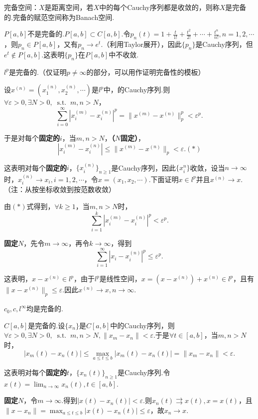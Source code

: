 \documentclass[bwprint, withoutpreface]{cumcmthesis}
\newcommand*{\st}{\mathop{}\!\mathrm{s.t.}\!\mathop{}}
\newcommand*{\norm}[1]{\| #1 \|}
\newcommand*{\nnorm}[2]{\| #1 \|_{#2}}
\begin{document}
完备空间：$X$是距离空间，若$X$中的每个Cauchy序列都是收敛的，则称$X$是完备的.完备的赋范空间称为Banach空间.

$P[a, b]$不是完备的.$P[a, b] \subset C[a, b]$.令$p_n(t) = 1 + \frac{t}{1!} + \frac{t^2}{2!} + \cdots + \frac{t^n}{n!}, n = 1, 2, \cdots$，则$p_n \in P[a, b]$，又有$p_n \to e^t$.（利用Taylor展开），因此$\{p_n\}$是Cauchy序列，但$e^t \not\in P[a, b]$.这表明$\{p_n\}$在$P[a, b]$中不收敛.

$l^p$是完备的.（仅证明$p \neq \infty$的部分，可以用作证明完备性的模板）

设$x^{(n)} = (x_1^{(n)}, x_2^{(n)}, \cdots)$是$l^p$中，的Cauchy序列.则$\forall \varepsilon > 0, \exists N > 0, \st m, n > N$，\[\sum_{i = 0}^{\infty}{|x_i^{(m)} - x_i^{(n)}|^p} = \nnorm{x^{(m)} - x^{(n)}}{p}^p < \varepsilon^p.\]

于是对每个\textbf{固定的}$i$，当$m, n > N$，\textbf{（$N$固定）}，\[|x_i^{(m)} - x_i^{(n)}| \leqslant \nnorm{x^{(m)} - x^{(n)}}{p} < \varepsilon. (*)\]

这表明对每个\textbf{固定的}$i$，$\{x_i^{(n)}\}_{n \geqslant 1}$是Cauchy序列，因此$\{x_i^{n}\}$收敛，设当$n \to \infty$时，$x_i^{(n)} \to x_i, i = 1, 2, \cdots$，令$x = (x_1, x_2, \cdots)$.下面证明$x \in l^p$并且$x^{(n)} \to x$.（注：从按坐标收敛到按范数收敛）

由$(*)$式得到，$\forall k \geqslant 1$，当$m, n > N$时，\[\sum_{i = 1}^{k}|x_i^{(m)} - x_i^{(n)}|^p < \varepsilon^p.\]

\textbf{固定$N$}，先令$m \to \infty$，再令$k \to \infty$，得到\[\sum_{i = 1}^{\infty}{|x_i - x_i^{(n)}|^p} \leqslant \varepsilon^p.\]

这表明，$x - x^{(n)} \in l^p$，由于$l^p$是线性空间，$x = (x - x^{(n)}) + x^{(n)} \in l^p$，且有$\nnorm{x - x^{(n)}}{p} \leqslant \varepsilon.$因此$x^{(n)} \to x, n \to \infty.$

$c_0, c, l^{\infty}$均是完备的.

$C[a, b]$是完备的.设$\{x_n\}$是$C[a, b]$中的Cauchy序列，则$\forall \varepsilon > 0, \exists N > 0, \st m, n > N, \norm{x_m - x_n} < \varepsilon$.于是$\forall t \in [a, b]$，当$m, n > N$时，\[|x_m(t) - x_n(t)| \leqslant \max_{a \leqslant t \leqslant b}{|x_m(t) - x_n(t)|} = \norm{x_m - x_n} < \varepsilon.\]

这表明对每个\textbf{固定的}$t$，$\{x_n(t)\}_{n \geqslant 1}$是Cauchy序列.令$x(t) = \lim_{n \to \infty}{x_n(t)}, t \in [a, b]$.

\textbf{固定$N$}，令$m \to \infty$.得到$|x(t) - x_n(t)| < \varepsilon$.则$x_n(t) \rightrightarrows x(t), x = x(t)$，且$\norm{x - x_n} = \max_{a \leqslant t \leqslant b}{|x(t) - x_n(t)| \leqslant \varepsilon}$，故$x_n \to x$.
\end{document}
